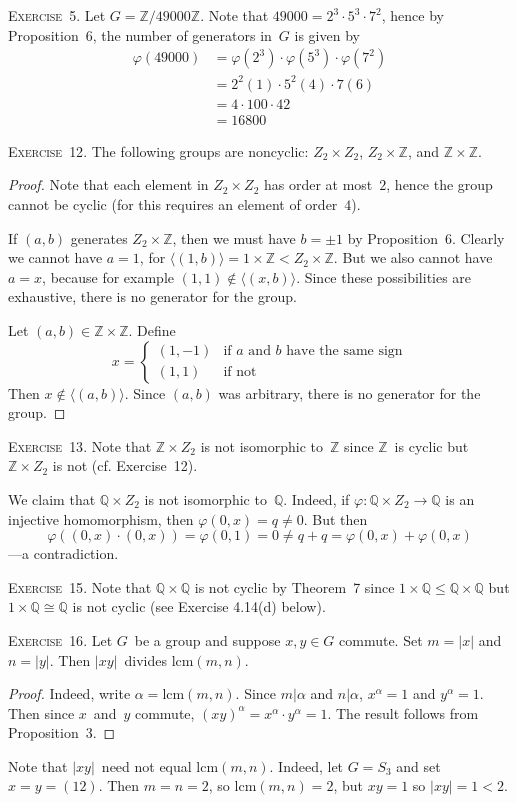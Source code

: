\documentclass[letterpaper]{article}
\newcommand{\exercise}[1]{\goodbreak\noindent\textsc{Exercise~{#1}.}}
\newcommand{\Z}{\mathbb{Z}}
\newcommand{\Q}{\mathbb{Q}}
\newcommand{\iso}{\cong}
\newcommand{\subgroup}{\le}
\newcommand{\lcm}[2]{\mathrm{lcm}({#1},{#2})}
\newcommand{\ord}[1]{|{#1}|}
\newcommand{\gen}[1]{\langle{#1}\rangle}
\begin{document}
\bigskip
\exercise{5} Let $G=\Z/49000\Z$. Note that $49000=2^3\cdot 5^3\cdot 7^2$, hence by Proposition~6, the number of generators in~$G$ is given by
\begin{align*}
\varphi(49000)&=\varphi(2^3)\cdot\varphi(5^3)\cdot\varphi(7^2)\\
	&=2^2(1)\cdot5^2(4)\cdot7(6)\\
	&=4\cdot 100\cdot 42\\
	&=16800
\end{align*}

\bigskip
\exercise{12}
The following groups are noncyclic: $Z_2\times Z_2$, $Z_2\times\Z$, and $\Z\times\Z$.
\begin{proof}
Note that each element in $Z_2\times Z_2$ has order at most~$2$, hence the group cannot be cyclic (for this requires an element of order~$4$).

If $(a,b)$ generates $Z_2\times\Z$, then we must have $b=\pm1$ by Proposition~6. Clearly we cannot have $a=1$, for $\gen{(1,b)}=1\times\Z<Z_2\times\Z$. But we also cannot have $a=x$, because for example $(1,1)\not\in\gen{(x,b)}$. Since these possibilities are exhaustive, there is no generator for the group.

Let $(a,b)\in\Z\times\Z$. Define
$$x=\begin{cases}
(1,-1)&\text{if $a$~and~$b$ have the same sign}\\
(1,1)&\text{if not}
\end{cases}$$
Then $x\not\in\gen{(a,b)}$. Since $(a,b)$ was arbitrary, there is no generator for the group.
\end{proof}

\exercise{13}
Note that $\Z\times Z_2$ is not isomorphic to~$\Z$ since $\Z$~is cyclic but $\Z\times Z_2$ is not (cf. Exercise~12).

We claim that $\Q\times Z_2$ is not isomorphic to~$\Q$. Indeed, if $\varphi:\Q\times Z_2\to\Q$ is an injective homomorphism, then $\varphi(0,x)=q\ne0$. But then
$$\varphi((0,x)\cdot(0,x))=\varphi(0,1)=0\ne q+q=\varphi(0,x)+\varphi(0,x)$$
---a contradiction.

\bigskip
\exercise{15}
Note that $\Q\times\Q$ is not cyclic by Theorem~7 since $1\times\Q\subgroup\Q\times\Q$ but $1\times\Q\iso\Q$ is not cyclic (see Exercise 4.14(d) below).

\bigskip
\exercise{16}
Let $G$~be a group and suppose $x,y\in G$ commute. Set $m=\ord{x}$ and $n=\ord{y}$. Then $\ord{xy}$~divides $\lcm{m}{n}$.
\begin{proof}
Indeed, write $\alpha=\lcm{m}{n}$. Since $m|\alpha$ and $n|\alpha$, $x^{\alpha}=1$ and $y^{\alpha}=1$. Then since $x$~and~$y$ commute, $(xy)^{\alpha}=x^{\alpha}\cdot y^{\alpha}=1$. The result follows from Proposition~3.
\end{proof}
\noindent Note that $\ord{xy}$~need not equal $\lcm{m}{n}$. Indeed, let $G=S_3$ and set $x=y=(12)$. Then $m=n=2$, so $\lcm{m}{n}=2$, but $xy=1$ so $\ord{xy}=1<2$.
\end{document}

